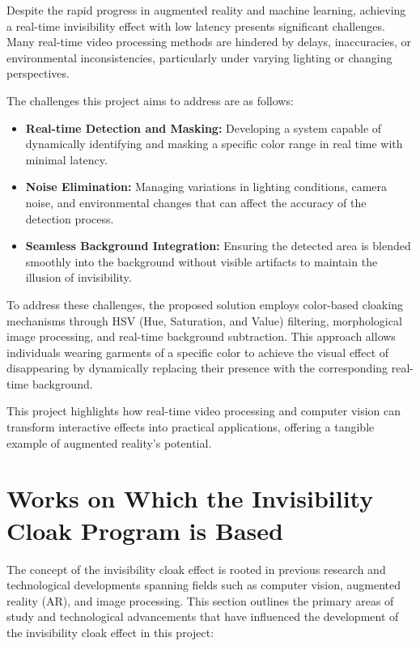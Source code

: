 \documentclass[onecolumn]{article} %
\begin{document}
Despite the rapid progress in augmented reality and machine learning, achieving a real-time invisibility effect with low latency presents significant challenges. Many real-time video processing methods are hindered by delays, inaccuracies, or environmental inconsistencies, particularly under varying lighting or changing perspectives.

The challenges this project aims to address are as follows:

\begin{itemize}
    \item \textbf{Real-time Detection and Masking:} Developing a system capable of dynamically identifying and masking a specific color range in real time with minimal latency.
    \item \textbf{Noise Elimination:} Managing variations in lighting conditions, camera noise, and environmental changes that can affect the accuracy of the detection process.
    \item \textbf{Seamless Background Integration:} Ensuring the detected area is blended smoothly into the background without visible artifacts to maintain the illusion of invisibility.
\end{itemize}

To address these challenges, the proposed solution employs color-based cloaking mechanisms through HSV (Hue, Saturation, and Value) filtering, morphological image processing, and real-time background subtraction. This approach allows individuals wearing garments of a specific color to achieve the visual effect of disappearing by dynamically replacing their presence with the corresponding real-time background.

This project highlights how real-time video processing and computer vision can transform interactive effects into practical applications, offering a tangible example of augmented reality's potential.

\section{Works on Which the Invisibility Cloak Program is Based}

The concept of the invisibility cloak effect is rooted in previous research and technological developments spanning fields such as computer vision, augmented reality (AR), and image processing. This section outlines the primary areas of study and technological advancements that have influenced the development of the invisibility cloak effect in this project:
\end{document}
